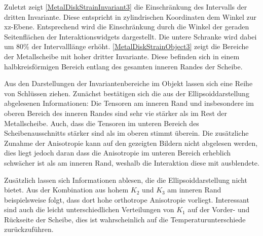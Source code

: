 \documentclass[a4paper,fontsize=12pt,toc=bib,halfparskip,ngerman]{scrartcl}
\begin{document}
Zuletzt zeigt \cref{MetalDiskStrainInvariant3} die Einschr\"ankung des Intervalls der dritten Invariante. Diese entspricht in zylindrischen Koordinaten dem Winkel zur xz-Ebene. Entsprechend wird die Einschr\"ankung durch die Winkel der geraden Seitenfl\"achen der Interaktionswidgets dargestellt. Die untere Schranke wird dabei um 80\% der Intervalll\"ange erh\"oht. \cref{MetalDiskStrainObject3} zeigt die Bereiche der Metallscheibe mit hoher dritter Invariante. Diese befinden sich in einem halbkreisf\"ormigen Bereich entlang des gesamten inneren Randes der Scheibe.

Aus den Darstellungen der Invariantenbereiche im Objekt lassen sich eine Reihe von Schl\"ussen ziehen. Zun\"achst best\"atigen sich die aus der Ellipsoiddarstellung abgelesenen Informationen: Die Tensoren am inneren Rand und insbesondere im oberen Bereich des inneren Randes sind sehr vie st\"arker als im Rest der Metallscheibe. Auch, dass die Tensoren im unteren Bereich des Scheibenausschnitts st\"arker sind als im oberen stimmt \"uberein. Die zus\"atzliche Zunahme der Anisotropie kann auf den gezeigten Bildern nicht abgelesen werden, dies liegt jedoch daran dass die Anisotropie im unteren Bereich erheblich schw\"acher ist als am inneren Rand, weshalb die Interaktion diese mit ausblendete.

Zus\"atzlich lassen sich Informationen ablesen, die die Ellipsoiddarstellung nicht bietet. Aus der Kombination aus hohem $K_2$ und $K_3$ am inneren Rand beispielsweise folgt, dass dort hohe orthotrope Anisotropie vorliegt. Interessant sind auch die leicht unterschiedlichen Verteilungen von $K_1$ auf der Vorder- und R\"uckseite der Scheibe, dies ist wahrscheinlich auf die Temperaturunterschiede zur\"uckzuf\"uhren. 
\end{document}

